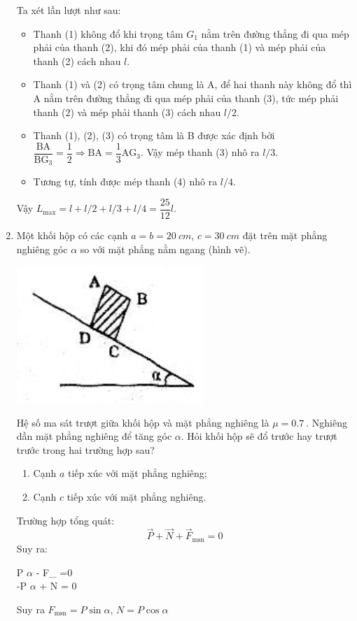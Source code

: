 \begin{enumerate}[label=\bfseries Câu \arabic*:]
{		Ta xét lần lượt như sau:
		\begin{itemize}
			\item Thanh (1) không đổ khi trọng tâm $G_1$ nằm trên đường thẳng đi qua mép phải của thanh (2), khi đó mép phải của thanh (1) và mép phải của thanh (2) cách nhau $l$.
			\item Thanh (1) và (2) có trọng tâm chung là A, để hai thanh này không đổ thì A nằm trên đường thẳng đi qua mép phải của thanh (3), tức mép phải thanh (2) và mép phải thanh (3) cách nhau $l/2$.
			\item Thanh (1), (2), (3) có trọng tâm là B được xác định bởi $\dfrac{\text{BA}}{\text{BG}_3} = \dfrac{1}{2} \Rightarrow \text{BA} = \dfrac{1}{3} \text{AG}_3$. Vậy mép thanh (3) nhô ra $l/3$.
			\item Tương tự, tính được mép thanh (4) nhô ra $l/4$.
		\end{itemize}
	Vậy $L_\text{max} = l + l/2 + l/3 + l/4 = \dfrac{25}{12}l$.
	}
	\item {}
	
	\cauhoi
	{Một khối hộp có các cạnh $a=b=\SI{20}{cm}$, $c=\SI{30}{cm}$ đặt trên mặt phẳng nghiêng góc $\alpha$ so với mặt phẳng nằm ngang (hình vẽ).
		\begin{center}
			\includegraphics[scale=1]{../figs/VN10-2021-PH-TP023-3.png}
		\end{center}
	Hệ số ma sát trượt giữa khối hộp và mặt phẳng nghiêng là $\mu = \SI{0.7}{}$. Nghiêng dần mặt phẳng nghiêng để tăng góc $\alpha$. Hỏi khối hộp sẽ đổ trước hay trượt trước trong hai trường hợp sau?
	\begin{enumerate}
		\item Cạnh $a$ tiếp xúc với mặt phẳng nghiêng;
		\item Cạnh $c$ tiếp xúc với mặt phẳng nghiêng.
	\end{enumerate}
	}
	
	\loigiai
	{Trường hợp tổng quát:
		$$\vec P + \vec N + \vec F_\text{msn} = 0$$
		Suy ra:
		\begin{cases}
			P \sin $\alpha$ - F_ =0 \\
			-P \cos $\alpha$ + N = 0
		\end{cases}
	Suy ra $F_\text{msn} = P \sin \alpha$, $N=P \cos \alpha$
	
}
\end{enumerate}
